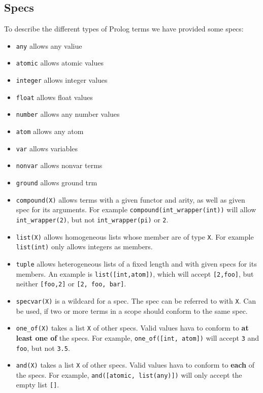 \documentclass[a4paper]{article}
\newcommand{\X}{\texttt{X}}
\begin{document}
\subsection{Specs}
To describe the different types of Prolog terms we have provided some specs:
\begin{itemize}
  \item{\texttt{any}} allows any valiue
  \item{\texttt{atomic}} allows atomic values
  \item{\texttt{integer}} allows integer values
  \item{\texttt{float}} allows float values
  \item{\texttt{number}} allows any number values
  \item{\texttt{atom}} allows any atom
  \item{\texttt{var}} allows variables
  \item{\texttt{nonvar}} allows nonvar terms
  \item{\texttt{ground}} allows ground trm
  \item{\texttt{compound(X)}} allows terms with a given functor and arity, as well as
    given spec for its arguments. For example
    \texttt{compound(int\_wrapper(int))} will allow \texttt{int\_wrapper(2)}, but
    not \texttt{int\_wrapper(pi)} or \texttt{2}. 
  \item{\texttt{list(X)}} allows homogeneous lists whose member are of type
    \X{}. For example \texttt{list(int)} only allows integers as members.
  \item{\texttt{tuple}} allows heterogeneous lists of a fixed length and with given specs
    for its members. An example is \texttt{list([int,atom])}, which will accept
    \texttt{[2,foo]}, but neither \texttt{[foo,2]} or \texttt{[2, foo, bar]}.
  \item{\texttt{specvar(X)}} is a wildcard for a spec. The spec can be referred to with
    \X{}. Can be used, if two or more terms in a scope should conform to the
    same spec.
  \item{\texttt{one\_of(X)}} takes a list \X{} of other specs. Valid values hava
    to conform to \textbf{at least one of} the specs. For example, \texttt{one\_of([int,
      atom])} will accept \texttt{3} and \texttt{foo}, but not \texttt{3.5}. 
  \item{\texttt{and(X)}} takes a list \X{} of other specs. Valid values hava
    to conform to \textbf{each} of the specs. For example, \texttt{and([atomic,
      list(any)])} will only accept the empty list \texttt{[]}.
\end{itemize}
\end{document}

